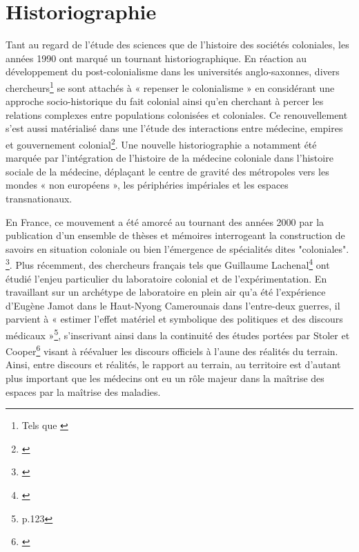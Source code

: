 \section*{Historiographie}

Tant au regard de l'étude des sciences que de l'histoire des sociétés coloniales, les années 1990 ont marqué un tournant historiographique. En réaction au développement du post-colonialisme dans les universités anglo-saxonnes, divers chercheurs\footnote{Tels que \cite{cooper_tensions_1997}} se sont attachés à « repenser le colonialisme »  en considérant une approche socio-historique du fait colonial ainsi qu'en cherchant à percer les relations complexes entre populations colonisées et coloniales. Ce renouvellement s'est aussi matérialisé dans une  l'étude des interactions entre médecine, empires et gouvernement colonial\footnote{\cite{anderson_where_1998,marks_what_1997,arnold_imperial_1989,harrison_towards_1990}}. Une nouvelle historiographie a notamment été marquée par l'intégration de l’histoire de la médecine coloniale dans l’histoire sociale de la médecine, déplaçant le centre de gravité des métropoles vers les mondes « non européens », les périphéries impériales et les espaces transnationaux. 

En France, ce mouvement a été amorcé au tournant des années 2000 par la publication d'un ensemble de thèses et mémoires interrogeant la construction de savoirs en situation coloniale ou bien l'émergence de spécialités dites "coloniales". \footnote{\cite{sibeud_construction_1999,singaravelou_ecole_1999,blais_les_2000,monnais-rousselot_medecine_1999,bretelle-establet_sante_1999,singaravelou_promethee_2013}}. 
Plus récemment, des chercheurs français tels que Guillaume Lachenal\footnote{\cite{lachenal_medecin_2010}} ont étudié l'enjeu particulier du \og laboratoire colonial \fg et de l'expérimentation. En travaillant sur un archétype de \of laboratoire en plein air \fg qu'a été l'expérience d'Eugène Jamot dans le Haut-Nyong Camerounais dans l'entre-deux guerres, il parvient à « estimer l’effet matériel et symbolique des politiques et des discours médicaux »\footnote{\cite{lachenal_medecin_2010}p.123}, s'inscrivant ainsi dans la continuité des études portées par Stoler et Cooper\footnote{\cite{cooper_tensions_1997}} visant à réévaluer les discours officiels à l'aune des réalités du terrain. Ainsi, entre discours et réalités, le rapport au terrain, au territoire est d'autant plus important que les médecins ont eu un rôle majeur dans la maîtrise des espaces par la maîtrise des maladies.  



